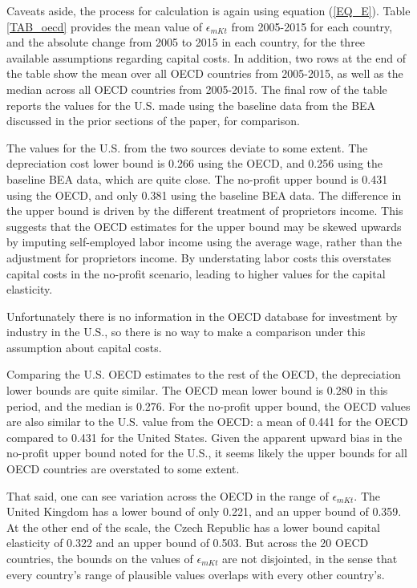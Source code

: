 Caveats aside, the process for calculation is again using equation (\ref{EQ_E}). Table \ref{TAB_oecd} provides the mean value of $\epsilon_{mKt}$ from 2005-2015 for each country, and the absolute change from 2005 to 2015 in each country, for the three available assumptions regarding capital costs. In addition, two rows at the end of the table show the mean over all OECD countries from 2005-2015, as well as the median across all OECD countries from 2005-2015. The final row of the table reports the values for the U.S. made using the baseline data from the BEA discussed in the prior sections of the paper, for comparison.

The values for the U.S. from the two sources deviate to some extent. The depreciation cost lower bound is 0.266 using the OECD, and 0.256 using the baseline BEA data, which are quite close. The no-profit upper bound is 0.431 using the OECD, and only 0.381 using the baseline BEA data. The difference in the upper bound is driven by the different treatment of proprietors income. This suggests that the OECD estimates for the upper bound may be skewed upwards by imputing self-employed labor income using the average wage, rather than the \cite{gommerupert2004} adjustment for proprietors income. By understating labor costs this overstates capital costs in the no-profit scenario, leading to higher values for the capital elasticity.

Unfortunately there is no information in the OECD database for investment by industry in the U.S., so there is no way to make a comparison under this assumption about capital costs.

Comparing the U.S. OECD estimates to the rest of the OECD, the depreciation lower bounds are quite similar. The OECD mean lower bound is 0.280 in this period, and the median is 0.276. For the no-profit upper bound, the OECD values are also similar to the U.S. value from the OECD: a mean of 0.441 for the OECD compared to 0.431 for the United States. Given the apparent upward bias in the no-profit upper bound noted for the U.S., it seems likely the upper bounds for all OECD countries are overstated to some extent.  

That said, one can see variation across the OECD in the range of $\epsilon_{mKt}$. The United Kingdom has a lower bound of only 0.221, and an upper bound of 0.359. At the other end of the scale, the Czech Republic has a lower bound capital elasticity of 0.322 and an upper bound of 0.503. But across the 20 OECD countries, the bounds on the values of $\epsilon_{mKt}$ are not disjointed, in the sense that every country's range of plausible values overlaps with every other country's.

